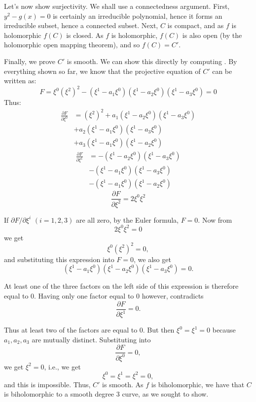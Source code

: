 \documentclass{book}
\begin{document}
\begin{Proof}
Let's now show surjectivity. We shall use a connectedness argument. First, $y^2-g(x) = 0$ is certainly an
irreducible polynomial, hence it forms an irreducible subset, hence a connected subset. Next, $C$ is compact,
and as $f$ is holomorphic $f(C)$ is closed. As $f$ is holomorphic, $f(C)$ is also open (by the holomorphic
open mapping theorem), and so $f(C) = C'$.

Finally, we prove $C'$ is smooth. We can show this directly by computing . By everything shown so far, we know
that the projective equation of $C'$ can be written as:
\[
  F = \xi^0(\xi^2)^2 - (\xi^1 - a_1\xi^0)(\xi^1-a_2\xi^0)(\xi^1-a_3\xi^0) = 0
\]
Thus:
\begin{align*}
\frac{\partial F}{\partial \xi^0} &= (\xi^2)^2 + a_1(\xi^1 - a_2\xi^0)(\xi^1 - a_3\xi^0)\\
                                  &+ a_2(\xi^1 - a_1\xi^0)(\xi^1 - a_3\xi^0)\\
                                  &+ a_3(\xi^1 - a_1\xi^0)(\xi^1 - a_2\xi^0)
\end{align*}
\begin{align*}
  \frac{\partial F}{\partial \xi^1} &= -(\xi^1 - a_2\xi^0)(\xi^1 - a_3\xi^0)\\
                                    &-(\xi^1 - a_1\xi^0)(\xi^1 - a_3\xi^0)\\
                                    &-(\xi^1 - a_1\xi^0)(\xi^1 - a_2\xi^0)
\end{align*}
\[
  \frac{\partial F}{\partial \xi^2} = 2\xi^0\xi^2
\]

If $\partial F/\partial \xi^i$ $(i = 1, 2, 3)$ are all zero, by the Euler formula, $F = 0$. Now from
\[
2\xi^0\xi^2 = 0
\]
we get
\[
\xi^0(\xi^2)^2 = 0,
\]
and substituting this expression into $F = 0$, we also get
\[
(\xi^1 - a_1\xi^0)(\xi^1 - a_2\xi^0)(\xi^1 - a_3\xi^0) = 0.
\]

At least one of the three factors on the left side of this expression is therefore equal to 0. Having only one factor equal to 0 however, contradicts
\[
\frac{\partial F}{\partial \xi^1} = 0.
\]

Thus at least two of the factors are equal to 0. But then $\xi^0 = \xi^1 = 0$ because $a_1, a_2, a_3$ are mutually distinct. Substituting into
\[
\frac{\partial F}{\partial \xi^0} = 0,
\]
we get $\xi^2 = 0$, i.e., we get
\[
\xi^0 = \xi^1 = \xi^2 = 0,
\]
and this is impossible. Thus, $C'$ is smooth. As $f$ is biholomorphic, we have that $C$ is biholomorphic to
a smooth degree $3$ curve, as we sought to show.
\end{Proof}
\end{document}
